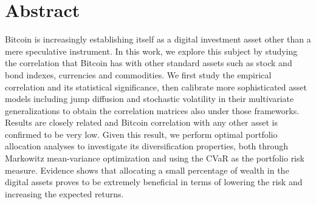 \chapter{Abstract}
\label{chpr:abstract}

Bitcoin is increasingly establishing itself as a digital investment asset other than a mere speculative instrument. In this work, we explore this subject by studying the correlation that Bitcoin has with other standard assets such as stock and bond indexes,  currencies and commodities. We first study the empirical correlation and its statistical significance, then calibrate more sophisticated asset models including jump diffusion and stochastic volatility in their multivariate generalizations to obtain the correlation matrices also under those frameworks. Results are closely related and Bitcoin correlation  with any other asset is confirmed to be very low. Given this result, we perform optimal portfolio allocation analyses to investigate its diversification properties, both through Markowitz mean-variance optimization and using the CVaR as the portfolio risk measure. Evidence shows that allocating a small percentage of wealth in the digital assets proves to be extremely beneficial in terms of lowering the risk and increasing the expected returns.




